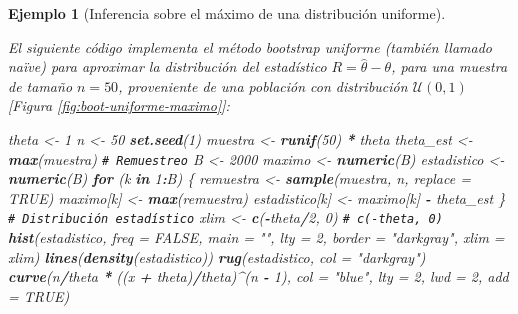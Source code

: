 \documentclass[
]{book}
\newenvironment{Shaded}{\begin{snugshade}}{\end{snugshade}}
\newcommand{\AttributeTok}[1]{\textcolor[rgb]{0.13,0.29,0.53}{#1}}
\newcommand{\CommentTok}[1]{\textcolor[rgb]{0.56,0.35,0.01}{\textit{#1}}}
\newcommand{\ConstantTok}[1]{\textcolor[rgb]{0.56,0.35,0.01}{#1}}
\newcommand{\ControlFlowTok}[1]{\textcolor[rgb]{0.13,0.29,0.53}{\textbf{#1}}}
\newcommand{\DecValTok}[1]{\textcolor[rgb]{0.00,0.00,0.81}{#1}}
\newcommand{\FunctionTok}[1]{\textcolor[rgb]{0.13,0.29,0.53}{\textbf{#1}}}
\newcommand{\NormalTok}[1]{#1}
\newcommand{\OtherTok}[1]{\textcolor[rgb]{0.56,0.35,0.01}{#1}}
\newcommand{\SpecialCharTok}[1]{\textcolor[rgb]{0.81,0.36,0.00}{\textbf{#1}}}
\newcommand{\StringTok}[1]{\textcolor[rgb]{0.31,0.60,0.02}{#1}}
\theoremstyle{break}
\newtheorem{example}{Ejemplo}[chapter]
\theoremstyle{nonumberplain}
\renewcommand{\CommentTok}[1]{\textcolor[rgb]{0.41,0.41,0.41}{\texttt{#1}}}
\begin{document}
\begin{example}[Inferencia sobre el máximo de una distribución uniforme]
\protect\hypertarget{exm:boot-maximo-uniforme}{}\label{exm:boot-maximo-uniforme}

El siguiente código implementa el método
bootstrap uniforme (también llamado naïve) para aproximar la
distribución del estadístico \(R=\hat{\theta}-\theta\), para una muestra
de tamaño \(n=50\), proveniente de una población con distribución
\(\mathcal{U}\left( 0,1\right)\) {[}Figura \ref{fig:boot-uniforme-maximo}{]}:

\begin{Shaded}
\begin{Highlighting}[]
\NormalTok{theta }\OtherTok{\textless{}{-}} \DecValTok{1}
\NormalTok{n }\OtherTok{\textless{}{-}} \DecValTok{50}
\FunctionTok{set.seed}\NormalTok{(}\DecValTok{1}\NormalTok{)}
\NormalTok{muestra }\OtherTok{\textless{}{-}} \FunctionTok{runif}\NormalTok{(}\DecValTok{50}\NormalTok{) }\SpecialCharTok{*}\NormalTok{ theta}
\NormalTok{theta\_est }\OtherTok{\textless{}{-}} \FunctionTok{max}\NormalTok{(muestra)}
\CommentTok{\# Remuestreo}
\NormalTok{B }\OtherTok{\textless{}{-}} \DecValTok{2000}
\NormalTok{maximo }\OtherTok{\textless{}{-}} \FunctionTok{numeric}\NormalTok{(B)}
\NormalTok{estadistico }\OtherTok{\textless{}{-}} \FunctionTok{numeric}\NormalTok{(B)}
\ControlFlowTok{for}\NormalTok{ (k }\ControlFlowTok{in} \DecValTok{1}\SpecialCharTok{:}\NormalTok{B) \{}
\NormalTok{    remuestra }\OtherTok{\textless{}{-}} \FunctionTok{sample}\NormalTok{(muestra, n, }\AttributeTok{replace =} \ConstantTok{TRUE}\NormalTok{)}
\NormalTok{    maximo[k] }\OtherTok{\textless{}{-}} \FunctionTok{max}\NormalTok{(remuestra)}
\NormalTok{    estadistico[k] }\OtherTok{\textless{}{-}}\NormalTok{ maximo[k] }\SpecialCharTok{{-}}\NormalTok{ theta\_est}
\NormalTok{\}}
\CommentTok{\# Distribución estadístico}
\NormalTok{xlim }\OtherTok{\textless{}{-}} \FunctionTok{c}\NormalTok{(}\SpecialCharTok{{-}}\NormalTok{theta}\SpecialCharTok{/}\DecValTok{2}\NormalTok{, }\DecValTok{0}\NormalTok{) }\CommentTok{\# c({-}theta, 0)}
\FunctionTok{hist}\NormalTok{(estadistico, }\AttributeTok{freq =} \ConstantTok{FALSE}\NormalTok{, }\AttributeTok{main =} \StringTok{""}\NormalTok{, }\AttributeTok{lty =} \DecValTok{2}\NormalTok{, }
     \AttributeTok{border =} \StringTok{"darkgray"}\NormalTok{, }\AttributeTok{xlim =}\NormalTok{ xlim)}
\FunctionTok{lines}\NormalTok{(}\FunctionTok{density}\NormalTok{(estadistico))}
\FunctionTok{rug}\NormalTok{(estadistico, }\AttributeTok{col =} \StringTok{"darkgray"}\NormalTok{)}
\FunctionTok{curve}\NormalTok{(n}\SpecialCharTok{/}\NormalTok{theta }\SpecialCharTok{*}\NormalTok{ ((x }\SpecialCharTok{+}\NormalTok{ theta)}\SpecialCharTok{/}\NormalTok{theta)}\SpecialCharTok{\^{}}\NormalTok{(n }\SpecialCharTok{{-}} \DecValTok{1}\NormalTok{), }\AttributeTok{col =} \StringTok{"blue"}\NormalTok{, }\AttributeTok{lty =} \DecValTok{2}\NormalTok{, }\AttributeTok{lwd =} \DecValTok{2}\NormalTok{, }\AttributeTok{add =} \ConstantTok{TRUE}\NormalTok{)}
\end{Highlighting}
\end{Shaded}


\end{example}
\end{document}

